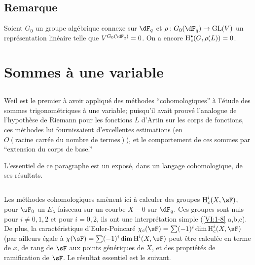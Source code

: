 \subsection{Remarque}\label{VI:2-9}

Soient $G_0$ un groupe algébrique connexe sur $\dF_q$ et 
$\rho:G_0(\dF_q) \to \operatorname{GL}(V)$ un représentation linéaire 
telle que $V^{G_0(\dF_q)}=0$. On a encore $\h_c^\bullet(G,\rho(L))=0$. 










\section{Sommes à une variable}\label{VI:3}





\subsection{}\label{VI:3-1}

Weil est le premier à avoir appliqué des méthodes ``cohomologiques'' à 
l'étude des sommes trigonométriques à une variable; puisqu'il avait 
prouvé l'analogue de l'hypothèse de Riemann pour les fonctions $L$ d'Artin 
sur les corps de fonctions, ces méthodes lui fournissaient d'excellentes 
estimations (en $O(\text{racine carrée du nombre de termes})$), et le 
comportement de ces sommes par ``extension du corps de base.'' 

L'essentiel de ce paragraphe est un exposé, dans un langage cohomologique, de 
ses résultats. 





\subsection{}\label{VI:3-2}

Les méthodes cohomologiques amènent ici à calculer des groupes 
$\h_c^i(X,\sF)$, pour $\sF_0$ un $E_\lambda$-faisceau sur un courbe $X-0$ sur 
$\dF_q$. Ces groupes sont nuls pour $i\ne 0,1,2$ et pour 
$i=0,2$, ils ont une interprétation simple (\ref{VI:1-8} a,b,c). De plus, la 
caractéristique d'Euler-Poincaré 
$\chi_c(\sF) = \sum (-1)^i \dim \h_c^i(X,\sF)$ (par ailleurs égale à 
$\chi(\sF) = \sum (-1)^i \dim \h^i(X,\sF)$ peut être calculée en terme de 
$x$, de rang de $\sF$ aux points génériques de $X$, et des propriétés 
de ramification de $\sF$. Le résultat essentiel est le suivant. 

